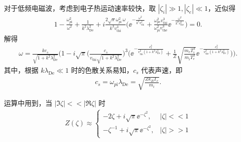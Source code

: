 \begin{exbox}
	对于低频电磁波，考虑到电子热运动速率较快，取 \(|\zeta_i|\gg1, |\zeta_e|\ll1\)，近似得
	\begin{align*}
		1 - \frac{\omega_{p\mathrm{i}}^2}{\omega^2} + \frac{1}{k^2\lambda_{\mathrm{De}}^2} + i\frac{2\sqrt{\pi}\omega_{p\mathrm{i}}^2\,\omega}{k^3v_{\mathrm{thi}}^3}\bigg(\ee^{-\frac{\omega^2}{k^2v_{\mathrm{thi}}^2}}+\frac{\omega_{p\mathrm{e}}^2v_{\mathrm{thi}}^3}{\omega_{p\mathrm{i}}^2v_{\mathrm{the}}^3}\ee^{-\frac{\omega^2}{k^2v_{\mathrm{the}}^2}}\bigg) = 0.
	\end{align*}
	解得
	\begin{align*}
		\omega = \frac{k c_s}{\sqrt{1+k^2\lambda_{\mathrm{De}}^2}}\Bigg(1 - i\sqrt{\pi}\bigg(\frac{c_s}{v_{\mathrm{thi}}\sqrt{1+k^2\lambda_{\mathrm{De}}^2}}\bigg)^3\bigg(\ee^{-\frac{c_s^2}{v_{\mathrm{thi}}^2\left(1+k^2\lambda_{\mathrm{De}}^2\right)}} + \frac{1}{Z}\sqrt{\frac{m_e T_i^3}{m_i T_e^3}}\ee^{-\frac{c_s^2}{v_{\mathrm{the}}^2\left(1+k^2\lambda_{\mathrm{De}}^2\right)}}\bigg)\Bigg).
	\end{align*}
	其中，根据 \(k\lambda_{\mathrm{De}}\ll1\) 时的色散关系易知，\(c_s\) 代表声速，即
	\begin{align*}
		c_s = \omega_{p\mathrm{i}}\lambda_{\mathrm{De}} = \sqrt{\frac{Zk_B T_e}{m_i}}.
	\end{align*}

	运算中用到，当 \(|\Im\zeta|<<|\Re\zeta|\) 时
	\begin{align*}
		Z(\zeta)\approx
		\begin{cases}
			-2\zeta + i\sqrt{\pi}\ee^{-\zeta^2},     & |\zeta|<<1 \\
			-\zeta^{-1} + i\sqrt{\pi}\ee^{-\zeta^2}, & |\zeta|>>1
		\end{cases}
	\end{align*}
\end{exbox}

